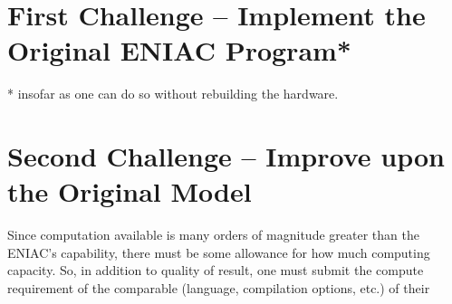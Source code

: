 
\section{First Challenge -- Implement the Original ENIAC Program*}
* insofar as one can do so without rebuilding the hardware.


\section{Second Challenge -- Improve upon the Original Model}
Since computation available is many orders of magnitude greater than the ENIAC's capability, there must be some allowance for how much computing capacity. So, in addition to quality of result, one must submit the compute requirement of the comparable (language, compilation options, etc.) of their 




